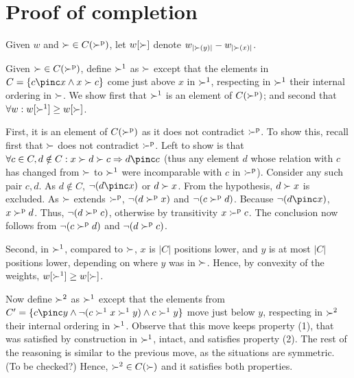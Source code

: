 
\section{Proof of completion}
\label{sec:prfCompl}
Given $w$ and ${\succ} \in C(\succ^\text{p})$, let $w[\succ]$ denote $w_{|\succ(y)|} - w_{|\succ(x)|}$. 

Given ${\succ} \in C(\succ^\text{p})$, define $\succ^1$ as $\succ$ except that the elements in $C = \{c \pinc x \land x \pref c\}$ come just above $x$ in $\succ^1$, respecting in $\succ^1$ their internal ordering in $\succ$. We show first that $\succ^1$ is an element of $C(\succ^\text{p})$; and second that $\forall w: w[\succ^1] \geq w[\succ]$. 

First, it is an element of $C(\succ^\text{p})$ as it does not contradict $\succ^\text{p}$. To show this, recall first that $\succ$ does not contradict $\succ^\text{p}$. Left to show is that $\forall c \in C, d \notin C: x \pref d \pref c \Rightarrow d \pinc c$ (thus any element $d$ whose relation with $c$ has changed from $\succ$ to $\succ^1$ were incomparable with $c$ in $\succ^\text{p}$). Consider any such pair $c, d$. As $d \notin C$, $\lnot(d \pinc x)$ or $d \succ x$. From the hypothesis, $d \succ x$ is excluded. 
As $\succ$ extends $\succ^\text{p}$, $\lnot(d \succ^\text{p} x)$ and $\lnot (c \succ^\text{p} d)$. Because $\lnot (d \pinc x)$, $x \succ^\text{p} d$. Thus, $\lnot (d \succ^\text{p} c)$, otherwise by transitivity $x \succ^\text{p} c$. The conclusion now follows from $\lnot (c \succ^\text{p} d)$ and $\lnot (d \succ^\text{p} c)$.

Second, in $\succ^1$, compared to $\succ$, $x$ is $|C|$ positions lower, and $y$ is at most $|C|$ positions lower, depending on where $y$ was in $\succ$. Hence, by convexity of the weights, $w[\succ^1] \geq w[\succ]$.

Now define $\succ^2$ as $\succ^1$ except that the elements from $C' = \{c \pinc y \land \lnot (c \pref^1 x \pref^1 y) \land c \pref^1 y\}$ move just below $y$, respecting in $\succ^2$ their internal ordering in $\succ^1$. Observe that this move keeps property (1), that was satisfied by construction in $\succ^1$, intact, and satisfies property (2). The rest of the reasoning is similar to the previous move, as the situations are symmetric. (To be checked?) Hence, ${\succ^2} \in C(\succ)$ and it satisfies both properties.

